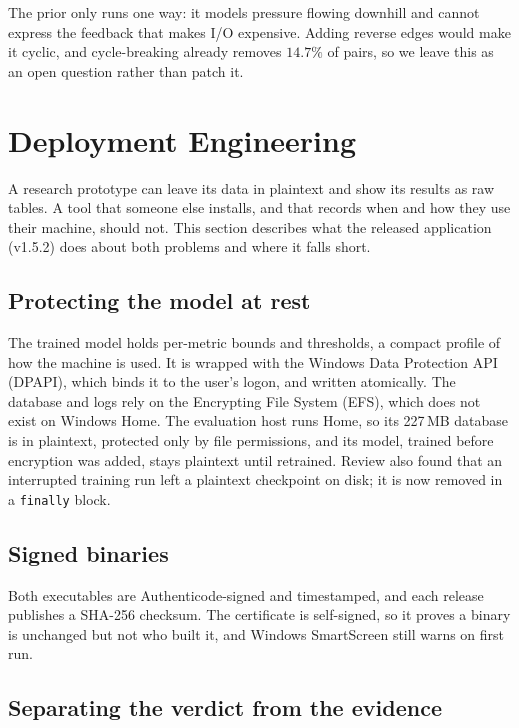 \documentclass[conference]{IEEEtran}
\begin{document}
The prior only runs one way: it models pressure flowing downhill and cannot
express the feedback that makes I/O expensive. Adding reverse edges would make
it cyclic, and cycle-breaking already removes $14.7\%$ of pairs, so we leave
this as an open question rather than patch it.

\section{Deployment Engineering}
\label{sec:deploy}

A research prototype can leave its data in plaintext and show its results as
raw tables. A tool that someone else installs, and that records when and how
they use their machine, should not. This section describes what the released
application (v1.5.2) does about both problems and where it falls short.

\subsection{Protecting the model at rest}

The trained model holds per-metric bounds and thresholds, a compact profile
of how the machine is used. It is wrapped with the Windows Data Protection
API (DPAPI), which binds it to the user's logon, and written atomically.
The database and logs rely on the Encrypting File System (EFS), which does
not exist on Windows Home. The evaluation host runs Home, so its 227\,MB
database is in plaintext, protected only by file permissions, and its model,
trained before encryption was added, stays plaintext until retrained. Review
also found that an interrupted training run left a plaintext checkpoint on
disk; it is now removed in a \texttt{finally} block.

\subsection{Signed binaries}

Both executables are Authenticode-signed and timestamped, and each release
publishes a SHA-256 checksum. The certificate is self-signed, so it proves a
binary is unchanged but not who built it, and Windows SmartScreen still warns
on first run.

\subsection{Separating the verdict from the evidence}
\end{document}
